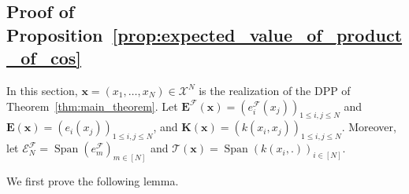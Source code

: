 \documentclass[twoside,11pt]{book}
\newtheorem{lemma}{Lemma}
\numberwithin{theorem}{chapter}
\numberwithin{definition}{chapter}
\numberwithin{proposition}{chapter}
\numberwithin{corollary}{chapter}
\numberwithin{example}{chapter}
\numberwithin{lemma}{chapter}
\numberwithin{assumption}{chapter}
\DeclareMathOperator{\Det}{Det}
\DeclareMathOperator{\Span}{\mathrm{Span}}
\DeclareMathOperator{\DPP}{\mathrm{DPP}}
\DeclareMathOperator{\EX}{\mathbb{E}}
\newcommand{\pc}[1]{\textcolor{blue}{#1}}
\begin{document}

\subsection{Proof of Proposition~\ref{prop:expected_value_of_product_of_cos}}
\label{s:proofOfExpectedProduct}
%

In this section, $\bm{x}  = (x_{1}, \dots , x_{N}) \in \mathcal{X}^{N}$ is the realization of the DPP of Theorem~\ref{thm:main_theorem}. Let $\bm{E}^{\mathcal{F}}(\bm{x}) = (e_{i}^{\mathcal{F}}(x_{j}))_{1 \leq i,j \leq N}$ and $\bm{E}(\bm{x}) = (e_{i}(x_{j}))_{1 \leq i,j \leq N}$, and $\bm{K}(\bm{x})= (k(x_{i},x_{j}))_{1 \leq i,j \leq N} $.
Moreover, let $\mathcal{E}^{\mathcal{F}}_{N} = \Span(e_{m}^{\mathcal{F}})_{m \in [N]}$ and $\mathcal{T}(\bm{x}) =  \Span \left( k(x_{i},.) \right)_{i \in [N]}$.

We first prove the following lemma.




\end{document}
